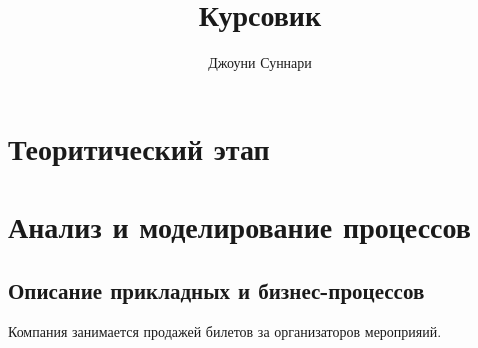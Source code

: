 \documentclass{article}
\author{Джоуни Суннари}
\title{Курсовик}
\begin{document}
\maketitle
\pagebreak
\tableofcontents
\pagebreak

\newcommand{\myparagraph}[1]{\paragraph{#1}\mbox{}\\}

\section{Теоритический этап}

\pagebreak

\section{Анализ и моделирование процессов}


\subsection{Описание прикладных и бизнес-процессов}

Компания занимается продажей билетов за организаторов мероприяий.
\end{document}
